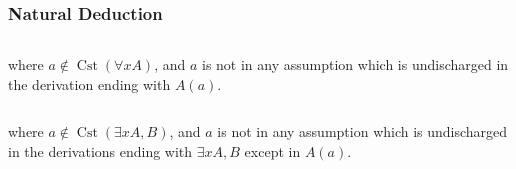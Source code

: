 \documentclass[UTF8,aspectratio=43,11pt,colorlinks,compress,openany]{beamer}%
\begin{document}
\begin{frame}\frametitle{Natural Deduction}
\begin{columns}
\centering
{}
\centering
{}
\end{columns}
where $a\notin\operatorname{Cst}(\forall x A)$, and $a$ is not in any assumption which is undischarged in the derivation ending with $A(a)$.\\
\hrulefill
\vspace{5pt}
\begin{columns}
\centering
{}
\centering
{}
\end{columns}
where $a\notin\operatorname{Cst}(\exists x A, B)$, and $a$ is not in any assumption which is undischarged in the derivations ending with $\exists x A, B$ except in $A(a)$.\\
\hrulefill
\vspace{5pt}
\begin{columns}
\centering
{}
\centering
{}
\end{columns}
\end{frame}
\end{document}
